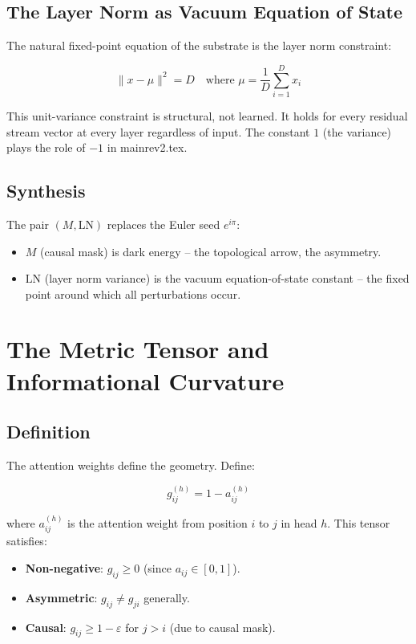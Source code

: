 \documentclass[onecolumn]{aastex631}
\begin{document}
\subsection{The Layer Norm as Vacuum Equation of State}

The natural fixed-point equation of the substrate is the layer norm constraint:

\begin{equation}
\|x - \mu\|^2 = D \quad \text{where } \mu = \frac{1}{D}\sum_{i=1}^{D} x_i
\end{equation}

This unit-variance constraint is structural, not learned. It holds for every residual stream vector at every layer regardless of input. The constant $1$ (the variance) plays the role of $-1$ in mainrev2.tex.

\subsection{Synthesis}

The pair $(M, \mathrm{LN})$ replaces the Euler seed $e^{i\pi}$:
\begin{itemize}
  \item $M$ (causal mask) is dark energy -- the topological arrow, the asymmetry.
  \item $\mathrm{LN}$ (layer norm variance) is the vacuum equation-of-state constant -- the fixed point around which all perturbations occur.
\end{itemize}

\section{The Metric Tensor and Informational Curvature}

\subsection{Definition}

The attention weights define the geometry. Define:

\begin{equation}
g_{ij}^{(h)} = 1 - a_{ij}^{(h)}
\end{equation}

where $a_{ij}^{(h)}$ is the attention weight from position $i$ to $j$ in head $h$. This tensor satisfies:
\begin{itemize}
  \item \textbf{Non-negative}: $g_{ij} \ge 0$ (since $a_{ij} \in [0,1]$).
  \item \textbf{Asymmetric}: $g_{ij} \neq g_{ji}$ generally.
  \item \textbf{Causal}: $g_{ij} \ge 1-\varepsilon$ for $j > i$ (due to causal mask).
\end{itemize}
\end{document}
